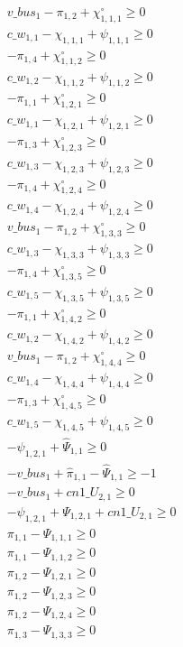 \documentclass[]{article}
\begin{document}
\begin{align*}
 & v\_bus_{1} - \pi_{1,2} + \chi^\circ_{1,1,1} \geq 0\\
 & c\_w_{1,1} - \chi_{1,1,1} + \psi_{1,1,1} \geq 0\\
 & -\pi_{1,4} + \chi^\circ_{1,1,2} \geq 0\\
 & c\_w_{1,2} - \chi_{1,1,2} + \psi_{1,1,2} \geq 0\\
 & -\pi_{1,1} + \chi^\circ_{1,2,1} \geq 0\\
 & c\_w_{1,1} - \chi_{1,2,1} + \psi_{1,2,1} \geq 0\\
 & -\pi_{1,3} + \chi^\circ_{1,2,3} \geq 0\\
 & c\_w_{1,3} - \chi_{1,2,3} + \psi_{1,2,3} \geq 0\\
 & -\pi_{1,4} + \chi^\circ_{1,2,4} \geq 0\\
 & c\_w_{1,4} - \chi_{1,2,4} + \psi_{1,2,4} \geq 0\\
 & v\_bus_{1} - \pi_{1,2} + \chi^\circ_{1,3,3} \geq 0\\
 & c\_w_{1,3} - \chi_{1,3,3} + \psi_{1,3,3} \geq 0\\
 & -\pi_{1,4} + \chi^\circ_{1,3,5} \geq 0\\
 & c\_w_{1,5} - \chi_{1,3,5} + \psi_{1,3,5} \geq 0\\
 & -\pi_{1,1} + \chi^\circ_{1,4,2} \geq 0\\
 & c\_w_{1,2} - \chi_{1,4,2} + \psi_{1,4,2} \geq 0\\
 & v\_bus_{1} - \pi_{1,2} + \chi^\circ_{1,4,4} \geq 0\\
 & c\_w_{1,4} - \chi_{1,4,4} + \psi_{1,4,4} \geq 0\\
 & -\pi_{1,3} + \chi^\circ_{1,4,5} \geq 0\\
 & c\_w_{1,5} - \chi_{1,4,5} + \psi_{1,4,5} \geq 0\\
 & -\psi_{1,2,1} + \hat{\Psi}_{1,1} \geq 0\\
 & -v\_bus_{1} + \hat{\pi} _{1,1} - \hat{\Psi}_{1,1} \geq -1\\
 & -v\_bus_{1} + cn1\_U_{2,1} \geq 0\\
 & -\psi_{1,2,1} + \Psi_{1,2,1} + cn1\_U_{2,1} \geq 0\\
 & \pi_{1,1} - \Psi_{1,1,1} \geq 0\\
 & \pi_{1,1} - \Psi_{1,1,2} \geq 0\\
 & \pi_{1,2} - \Psi_{1,2,1} \geq 0\\
 & \pi_{1,2} - \Psi_{1,2,3} \geq 0\\
 & \pi_{1,2} - \Psi_{1,2,4} \geq 0\\
 & \pi_{1,3} - \Psi_{1,3,3} \geq 0\\

\end{align*}
\end{document}
